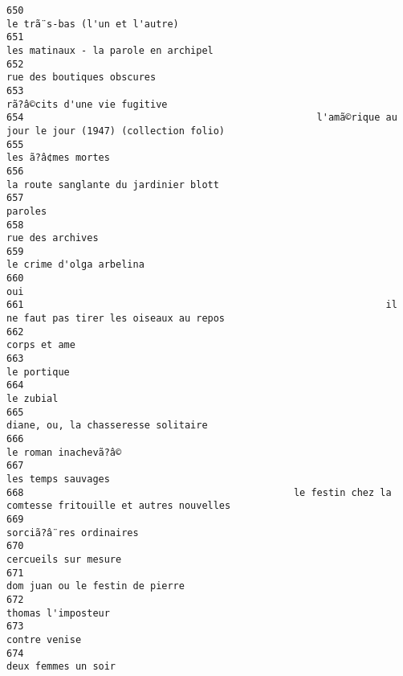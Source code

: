 \documentclass[
]{report}
\begin{document}
\begin{verbatim}
650                                                                          le trã¨s-bas (l'un et l'autre)
651                                                                    les matinaux - la parole en archipel
652                                                                              rue des boutiques obscures
653                                                                            rã?â©cits d'une vie fugitive
654                                                   l'amã©rique au jour le jour (1947) (collection folio)
655                                                                                      les ã?â¢mes mortes
656                                                                   la route sanglante du jardinier blott
657                                                                                                 paroles
658                                                                                        rue des archives
659                                                                                le crime d'olga arbelina
660                                                                                                     oui
661                                                               il ne faut pas tirer les oiseaux au repos
662                                                                                            corps et ame
663                                                                                             le portique
664                                                                                               le zubial
665                                                                     diane, ou, la chasseresse solitaire
666                                                                                    le roman inachevã?â©
667                                                                                      les temps sauvages
668                                               le festin chez la comtesse fritouille et autres nouvelles
669                                                                                 sorciã?â¨res ordinaires
670                                                                                    cercueils sur mesure
671                                                                         dom juan ou le festin de pierre
672                                                                                      thomas l'imposteur
673                                                                                           contre venise
674                                                                                     deux femmes un soir

\end{verbatim}
\end{document}

